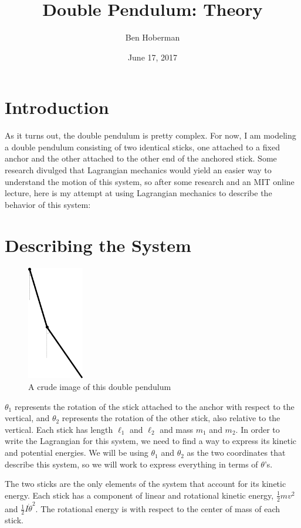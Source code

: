 \documentclass[]{article}
\title{Double Pendulum: Theory}
\author{Ben Hoberman}
\begin{document}
	
\date{June 17, 2017}
\maketitle

\newcommand{\lagr}{\mathcal{L}}

\section{Introduction}
As it turns out, the double pendulum is pretty complex. For now, I am modeling a double pendulum consisting of two identical sticks, one attached to a fixed anchor and the other attached to the other end of the anchored stick. Some research divulged that Lagrangian mechanics would yield an easier way to understand the motion of this system, so after some research and an MIT online lecture, here is my attempt at using Lagrangian mechanics to describe the behavior of this system:

\section{Describing the System}
\begin{figure}[h!]
	\includegraphics[height=5cm]{situation}
	\caption{A crude image of this double pendulum}
\end{figure}
$\theta_1$ represents the rotation of the stick attached to the anchor with respect to the vertical, and $\theta_2$ represents the rotation of the other stick, also relative to the vertical. Each stick has length $\ell_1$ and $\ell_2$ and mass $m_1$ and $m_2$. In order to write the Lagrangian for this system, we need to find a way to express its kinetic and potential energies. We will be using $\theta_1$ and $\theta_2$ as the two coordinates that describe this system, so we will work to express everything in terms of $\theta$'s.

The two sticks are the only elements of the system that account for its kinetic energy. Each stick has a component of linear and rotational kinetic energy, $\frac{1}{2}mv^2$ and $\frac{1}{2}I\dot{\theta}^2$. The rotational energy is with respect to the center of mass of each stick.
\end{document}
